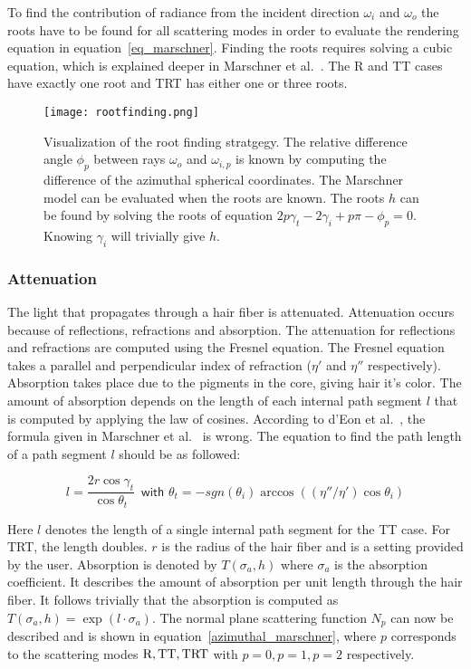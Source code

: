 \documentclass[11pt,a4paper]{report}
\begin{document}
To find the contribution of radiance from the incident direction $\omega_i$ and $\omega_o$ the roots have to be found for all scattering modes in order to evaluate the rendering equation in equation~\ref{eq_marschner}. Finding the roots requires solving a cubic equation, which is explained deeper in Marschner et al.~\cite{marschner}. The R and TT cases have exactly one root and TRT has either one or three roots.

\begin{figure}
\begin{center}
\texttt{[image: rootfinding.png]}
\end{center}

\caption{Visualization of the root finding stratgegy. The relative difference angle $\phi_p$ between rays $\omega_o$ and $\omega_{i,p}$ is known by computing the difference of the azimuthal spherical coordinates. The Marschner model can be evaluated when the roots are known. The roots $h$ can be found by solving the roots of equation $2p\gamma_t - 2\gamma_i + p\pi - \phi_p = 0$. Knowing $\gamma_i$ will trivially give $h$.}

\label{fig_rootfinding}
\end{figure}

\subsubsection{Attenuation}

The light that propagates through a hair fiber is attenuated. Attenuation occurs because of reflections, refractions and absorption. The attenuation for reflections and refractions are computed using the Fresnel equation. The Fresnel equation takes a parallel and perpendicular index of refraction ($\eta'$ and $\eta''$ respectively). Absorption takes place due to the pigments in the core, giving hair it's color. The amount of absorption depends on the length of each internal path segment $l$ that is computed by applying the law of cosines. According to d'Eon et al.~\cite{eon2011}, the formula given in Marschner et al.~\cite{marschner} is wrong. The equation to find the path length of a path segment $l$ should be as followed:

\begin{equation}
l = \frac{2r \cos \gamma_t}{\cos \theta_t}\,\,\, \textsf{with $\theta_t = -sgn(\theta_i) \arccos ((\eta'' / \eta') \cos \theta_i)$}
\end{equation}

Here $l$ denotes the length of a single internal path segment for the TT case. For TRT, the length doubles. $r$ is the radius of the hair fiber and is a setting provided by the user. Absorption is denoted by $T(\sigma_a, h)$ where $\sigma_a$ is the absorption coefficient. It describes the amount of absorption per unit length through the hair fiber. It follows trivially that the absorption is computed as $T(\sigma_a, h) = \exp( l \cdot \sigma_a )$. The normal plane scattering function $N_p$ can now be described and is shown in equation~\ref{azimuthal_marschner}, where $p$ corresponds to the scattering modes ${\textnormal{R}, \textnormal{TT}, \textnormal{TRT}}$ with $p=0, p=1, p=2$ respectively.
\end{document}
